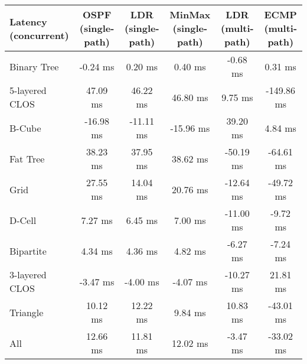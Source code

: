\begin{tabular}{l|ccccc}
Latency (concurrent) & OSPF (single-path) & LDR (single-path) & MinMax (single-path) & LDR (multi-path) & ECMP (multi-path) \\
\hline
Binary Tree          & -0.24 ms           & 0.20 ms           & 0.40 ms              & -0.68 ms         & 0.31 ms           \\
5-layered CLOS       & 47.09 ms           & 46.22 ms          & 46.80 ms             & 9.75 ms          & -149.86 ms        \\
B-Cube               & -16.98 ms          & -11.11 ms         & -15.96 ms            & 39.20 ms         & 4.84 ms           \\
Fat Tree             & 38.23 ms           & 37.95 ms          & 38.62 ms             & -50.19 ms        & -64.61 ms         \\
Grid                 & 27.55 ms           & 14.04 ms          & 20.76 ms             & -12.64 ms        & -49.72 ms         \\
D-Cell               & 7.27 ms            & 6.45 ms           & 7.00 ms              & -11.00 ms        & -9.72 ms          \\
Bipartite            & 4.34 ms            & 4.36 ms           & 4.82 ms              & -6.27 ms         & -7.24 ms          \\
3-layered CLOS       & -3.47 ms           & -4.00 ms          & -4.07 ms             & -10.27 ms        & 21.81 ms          \\
Triangle             & 10.12 ms           & 12.22 ms          & 9.84 ms              & 10.83 ms         & -43.01 ms         \\
All                  & 12.66 ms           & 11.81 ms          & 12.02 ms             & -3.47 ms         & -33.02 ms         \\
\end{tabular}